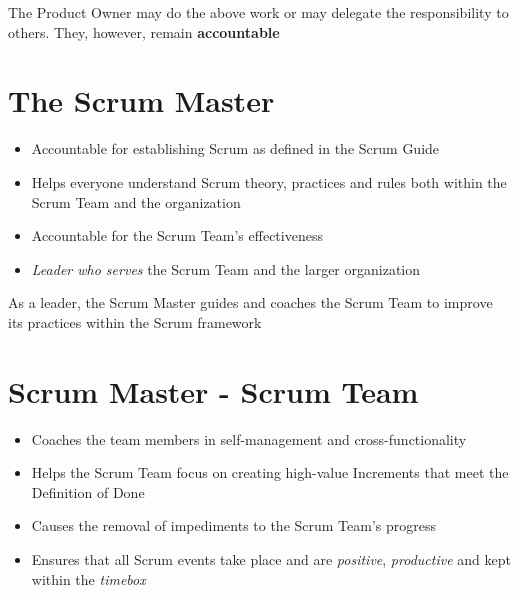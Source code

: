 \documentclass[a4paper,11pt,twocolumn]{article}
\begin{document}
\begin{tcolorbox}[colback=black!8!white,colframe=gray!50!black,title=Note,sharp corners,fonttitle=\normalsize\bfseries,fontupper=\normalsize,left=0.7em,right=0.7em]
	The Product Owner may do the above work or may delegate the responsibility to others. They, however, remain \textbf{accountable}
\end{tcolorbox}

\section*{The Scrum Master}
\begin{itemize}
    \item Accountable for establishing Scrum as defined in the Scrum Guide
    \item Helps everyone understand Scrum theory, practices and rules both within the Scrum Team and the organization
    \item Accountable for the Scrum Team's effectiveness
    \item \textit{Leader who serves} the Scrum Team and the larger organization
\end{itemize}

\begin{tcolorbox}[colback=black!8!white,colframe=gray!50!black,title=Note,sharp corners,fonttitle=\normalsize\bfseries,fontupper=\normalsize,left=0.7em,right=0.7em]
	As a leader, the Scrum Master guides and coaches the Scrum Team to improve its practices within the Scrum framework
\end{tcolorbox}

\section*{Scrum Master - Scrum Team}
\begin{itemize}
    \item Coaches the team members in self-management and cross-functionality
    \item Helps the Scrum Team focus on creating high-value Increments that meet the Definition of Done
    \item Causes the removal of impediments to the Scrum Team's progress
    \item Ensures that all Scrum events take place and are \textit{positive}, \textit{productive} and kept within the \textit{timebox}
\end{itemize}
\end{document}
